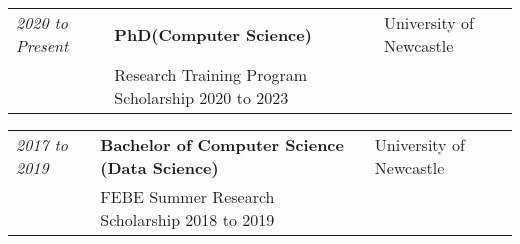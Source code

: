 \documentclass{myresume}
\begin{document}

        \begin{tabularx}{\textwidth}{ >{\hsize=0.25\hsize}X  >{\hsize=0.5\hsize}X >{\hsize=0.25\hsize}X }
                \textit{2020 to Present} & \textbf{PhD(Computer Science)} & University of Newcastle \\
            & Research Training Program Scholarship 2020 to 2023 & \\
        \end{tabularx}

        \begin{tabularx}{\textwidth}{ >{\hsize=0.25\hsize}X  >{\hsize=0.5\hsize}X >{\hsize=0.25\hsize}X }
            \textit{2017 to 2019} & \textbf{Bachelor of Computer Science (Data Science)} & University of Newcastle \\
            & FEBE Summer Research Scholarship 2018 to 2019 & \\
        \end{tabularx}
\end{document}
